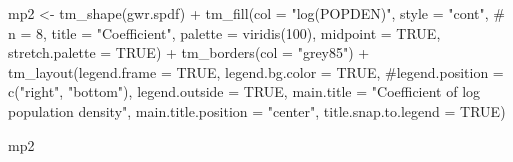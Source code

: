 \documentclass[
  letterpaper,
  DIV=11,
  numbers=noendperiod]{scrreprt}
\newenvironment{Shaded}{\begin{snugshade}}{\end{snugshade}}
\newcommand{\AttributeTok}[1]{\textcolor[rgb]{0.40,0.45,0.13}{#1}}
\newcommand{\CommentTok}[1]{\textcolor[rgb]{0.37,0.37,0.37}{#1}}
\newcommand{\ConstantTok}[1]{\textcolor[rgb]{0.56,0.35,0.01}{#1}}
\newcommand{\DecValTok}[1]{\textcolor[rgb]{0.68,0.00,0.00}{#1}}
\newcommand{\FunctionTok}[1]{\textcolor[rgb]{0.28,0.35,0.67}{#1}}
\newcommand{\NormalTok}[1]{\textcolor[rgb]{0.00,0.23,0.31}{#1}}
\newcommand{\OtherTok}[1]{\textcolor[rgb]{0.00,0.23,0.31}{#1}}
\newcommand{\SpecialCharTok}[1]{\textcolor[rgb]{0.37,0.37,0.37}{#1}}
\newcommand{\StringTok}[1]{\textcolor[rgb]{0.13,0.47,0.30}{#1}}
\begin{document}
\begin{Shaded}
\begin{Highlighting}[]
\NormalTok{mp2 }\OtherTok{\textless{}{-}} \FunctionTok{tm\_shape}\NormalTok{(gwr.spdf) }\SpecialCharTok{+}
  \FunctionTok{tm\_fill}\NormalTok{(}\AttributeTok{col =} \StringTok{"log(POPDEN)"}\NormalTok{, }
          \AttributeTok{style =} \StringTok{"cont"}\NormalTok{, }
          \CommentTok{\# n = 8,}
          \AttributeTok{title =} \StringTok{"Coefficient"}\NormalTok{, }
          \AttributeTok{palette =} \FunctionTok{viridis}\NormalTok{(}\DecValTok{100}\NormalTok{),}
          \AttributeTok{midpoint =} \ConstantTok{TRUE}\NormalTok{, }\AttributeTok{stretch.palette =} \ConstantTok{TRUE}\NormalTok{) }\SpecialCharTok{+}
  \FunctionTok{tm\_borders}\NormalTok{(}\AttributeTok{col =} \StringTok{"grey85"}\NormalTok{) }\SpecialCharTok{+}
  \FunctionTok{tm\_layout}\NormalTok{(}\AttributeTok{legend.frame =} \ConstantTok{TRUE}\NormalTok{, }\AttributeTok{legend.bg.color =} \ConstantTok{TRUE}\NormalTok{,}
            \CommentTok{\#legend.position = c("right", "bottom"),}
            \AttributeTok{legend.outside =} \ConstantTok{TRUE}\NormalTok{,}
            \AttributeTok{main.title =} \StringTok{"Coefficient of log population density"}\NormalTok{, }
            \AttributeTok{main.title.position =} \StringTok{"center"}\NormalTok{,}
            \AttributeTok{title.snap.to.legend =} \ConstantTok{TRUE}\NormalTok{) }

\NormalTok{mp2 }
\end{Highlighting}
\end{Shaded}
\end{document}
